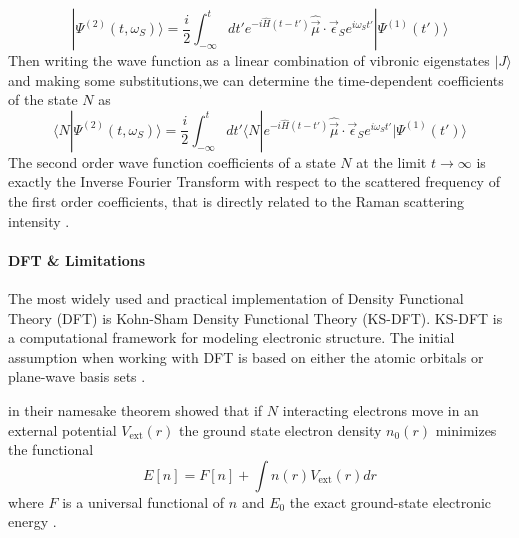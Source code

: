 \documentclass[10pt]{article}
\begin{document}
\begin{equation}
| \Psi^{(2)}(t, \omega_S)\rangle = \frac{i}{2} \int_{-\infty}^t dt' e^{-i\hat{H}(t-t')}\hat{\vec{\mu}} \cdot \vec{\epsilon}_S e^{i\omega_S t'}| \Psi^{(1)}(t')\rangle
\end{equation}
Then writing the wave function as a linear combination of vibronic eigenstates $|J\rangle$ and making some substitutions,we can determine the time-dependent coefficients of the state $N$ as
\begin{equation}
\langle N | \Psi^{(2)}(t, \omega_S)\rangle = \frac{i}{2} \int_{-\infty}^t dt' \langle N | e^{-i\hat{H}(t-t')} \hat{\vec{\mu}} \cdot \vec{\epsilon}_S e^{i\omega_S t'}| \Psi^{(1)}(t')\rangle
\end{equation}
The second order wave function coefficients of a state $N$ at the limit $t \to \infty$ is exactly the Inverse Fourier Transform with respect to the scattered frequency of the first order coefficients, that is directly related to the Raman scattering intensity \citep{dall2022time}.

\paragraph{DFT \& Limitations} The most widely used and practical implementation of Density Functional Theory (DFT) is Kohn-Sham Density Functional Theory (KS-DFT). KS-DFT is a computational framework for modeling electronic structure. The initial assumption when working with DFT is based on either the atomic orbitals or plane-wave basis sets \citep{epifanovsky2021software, frisch2016gaussian}.

\citet{hohenberg1964inhomogeneous} in their namesake theorem showed that if $N$ interacting electrons move in an external potential $V_{\text{ext}}(r)$ the ground state electron density $n_0(r)$ minimizes the functional
\begin{equation}
    E[n] = F[n] + \int n(r) V_{\text{ext}}(r)  dr
\end{equation}
where $F$ is a universal functional of $n$ and $E_0$ the exact ground-state electronic energy \citep{kent1999techniques}.
\end{document}
